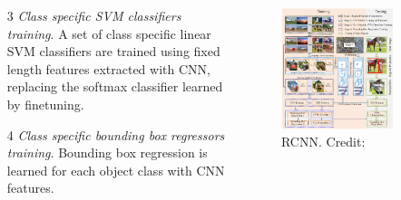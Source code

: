 \documentclass{beamer}
\begin{document}
\begin{frame}{}
	\begin{columns}
		\begin{column}{0.5\textwidth}
			\begin{enumerate}
				\item[3] \emph{Class specific SVM classifiers training}. A set of class specific linear SVM classifiers are trained using fixed length features extracted with CNN, replacing the softmax classifier learned by finetuning.
				\item[4] \emph{Class specific bounding box regressors training}. Bounding box regression is learned for each object class with CNN features.
			\end{enumerate}
		\end{column}
		\begin{column}{0.5\textwidth}
			\begin{figure}
				\centering
				\includegraphics[width=0.9\textwidth]{images/RCNN.PNG}
				\caption{RCNN.
					\hbox{\scriptsize Credit:}}
			\end{figure}
		\end{column}
	\end{columns}
\end{frame}
\end{document}
